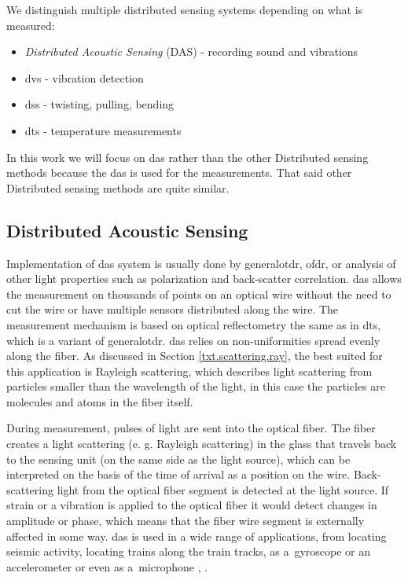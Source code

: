 We distinguish multiple distributed sensing systems depending on what is measured:
\begin{itemize}
    \item \emph{Distributed Acoustic Sensing} (DAS) - recording sound and vibrations
    \item \ac{dvs} - vibration detection
    \item \ac{dss} - twisting, pulling, bending
    \item \ac{dts} - temperature measurements
\end{itemize}

In this work we will focus on \ac{das} rather than the other Distributed sensing methods because the \ac{das} is used for the measurements. That said other Distributed sensing methods are quite similar.


\subsection{Distributed Acoustic Sensing}\label{txt.das}

Implementation of \ac{das} system is usually done by \ac{generalotdr}, \ac{ofdr}, or analysis of other light properties such as polarization and back-scatter correlation. \ac{das} allows the measurement on thousands of points on an optical wire without the need to cut the wire or have multiple sensors distributed along the wire. The measurement mechanism is based on optical reflectometry the same as in \ac{dts}, which is a variant of \ac{generalotdr}. \ac{das} relies on non-uniformities spread evenly along the fiber. As discussed in Section \ref{txt.scattering.ray}, the best suited for this application is Rayleigh scattering, which describes light scattering from particles smaller than the wavelength of the light, in this case the particles are molecules and atoms in the fiber itself.

During measurement, pulses of light are sent into the optical fiber. The fiber creates a light scattering (e. g. Rayleigh scattering) in the glass that travels back to the sensing unit (on the same side as the light source), which can be interpreted on the basis of the time of arrival as a position on the wire. Back-scattering light from the optical fiber segment is detected at the light source. If strain or a vibration is applied to the optical fiber it would detect changes in amplitude or phase, which means that the fiber wire segment is externally affected in some way. \ac{das} is used in a wide range of applications, from locating seismic activity, locating trains along the train tracks, as a~gyroscope or an accelerometer or even as a~microphone \cite{WangYu2017RDVM}, \cite{kislov_das_newparadigm}.

